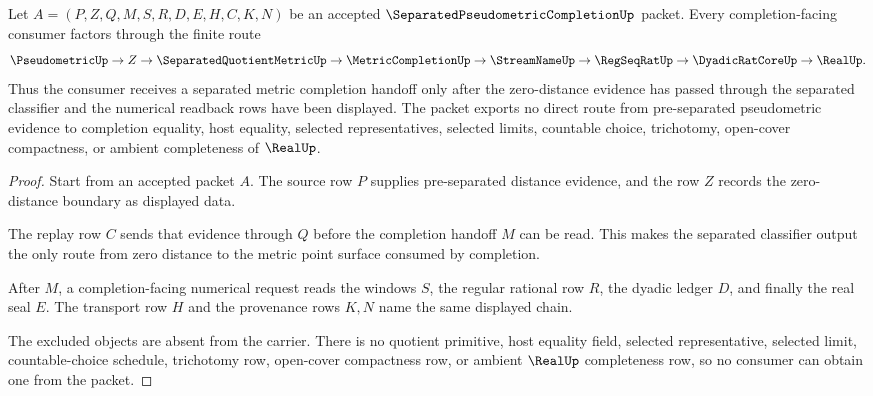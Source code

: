 \begin{theorem}
\label{thm:separated-pseudometric-completion-completion-route}
Let $A=(P,Z,Q,M,S,R,D,E,H,C,K,N)$ be an accepted $\SeparatedPseudometricCompletionUp$ packet. Every completion-facing consumer factors through the finite route
$$
\PseudometricUp\to Z\to\SeparatedQuotientMetricUp\to\MetricCompletionUp\to\StreamNameUp\to\RegSeqRatUp\to\DyadicRatCoreUp\to\RealUp .
$$
Thus the consumer receives a separated metric completion handoff only after the zero-distance evidence has passed through the separated classifier and the numerical readback rows have been displayed. The packet exports no direct route from pre-separated pseudometric evidence to completion equality, host equality, selected representatives, selected limits, countable choice, trichotomy, open-cover compactness, or ambient completeness of $\RealUp$.
\end{theorem}
\begin{proof}
Start from an accepted packet $A$. The source row $P$ supplies pre-separated distance evidence, and the row $Z$ records the zero-distance boundary as displayed data.

The replay row $C$ sends that evidence through $Q$ before the completion handoff $M$ can be read. This makes the separated classifier output the only route from zero distance to the metric point surface consumed by completion.

After $M$, a completion-facing numerical request reads the windows $S$, the regular rational row $R$, the dyadic ledger $D$, and finally the real seal $E$. The transport row $H$ and the provenance rows $K,N$ name the same displayed chain.

The excluded objects are absent from the carrier. There is no quotient primitive, host equality field, selected representative, selected limit, countable-choice schedule, trichotomy row, open-cover compactness row, or ambient $\RealUp$ completeness row, so no consumer can obtain one from the packet.
\end{proof}

